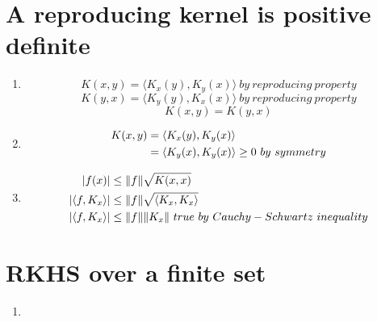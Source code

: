 \documentclass{article}
\begin{document}
\section{A reproducing kernel is positive definite}
\begin{enumerate}
    \item 
        \[K(x,y) = \langle K_x(y), K_y(x) \rangle\ by\ reproducing\ property\]
        \[K(y,x) = \langle K_y(y), K_x(x) \rangle\ by\ reproducing\ property\] 
        \[K(x,y) = K(y,x)\]
    \item
        \begin{equation}
        \begin{aligned}
        K(x,y) & = \langle K_x(y), K_y(x) \rangle\\
        & =  \langle K_y(x), K_y(x) \rangle \ge 0\ by\ symmetry\notag \\
        \end{aligned}
        \end{equation}
    \item 
        \begin{equation}
        \begin{aligned}
        |f(x)| & \le \|f\|\sqrt{K(x,x)}\\
        |\langle f, K_x \rangle|& \le  \|f\| \sqrt{\langle K_x, K_x \rangle} \notag \\
        |\langle f, K_x \rangle|& \le  \|f\| \| K_x \|\ true\ by\ Cauchy-Schwartz\ inequality \notag \\
        \end{aligned}
        \end{equation}

\end{enumerate}

\section{RKHS over a finite set}
\begin{enumerate}
    \item 
        

\end{enumerate}

\vspace{0.5cm}


\vspace{0.5cm}
\end{document}
